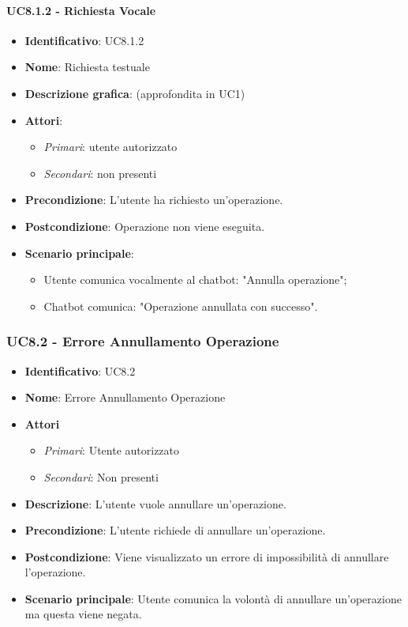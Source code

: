 \paragraph{UC8.1.2 - Richiesta Vocale}
\begin{itemize}
   \item \textbf{Identificativo}: UC8.1.2
   \item \textbf{Nome}: Richiesta testuale
   \item \textbf{Descrizione grafica}: (approfondita in UC1)
   \item \textbf{Attori}:
   \begin{itemize} 
       \item \textit{Primari}: utente autorizzato
       \item \textit{Secondari}: non presenti
   \end{itemize}
       \item \textbf{Precondizione}: L'utente ha richiesto un'operazione.
       \item \textbf{Postcondizione}: Operazione non viene eseguita. 
    \item \textbf{Scenario principale}: 
       \begin{itemize}
        \item Utente comunica vocalmente al chatbot: "Annulla operazione";
        \item Chatbot comunica: "Operazione annullata con successo".
       \end{itemize}
\end{itemize}

\subsubsection{UC8.2 - Errore Annullamento Operazione}
\begin{itemize}
	\item \textbf{Identificativo}: UC8.2
	\item \textbf{Nome}: Errore Annullamento Operazione 
	\item \textbf{Attori}
	\begin{itemize} 
		\item \textit{Primari}: Utente autorizzato
		\item \textit{Secondari}: Non presenti
	\end{itemize}
	\item \textbf{Descrizione}: L'utente vuole annullare un'operazione.
	\item \textbf{Precondizione}: L'utente richiede di annullare un'operazione.
	\item \textbf{Postcondizione}: Viene visualizzato un errore di impossibilità di annullare l'operazione.
	\item \textbf{Scenario principale}: Utente comunica la volontà di annullare un'operazione ma questa viene negata.
\end{itemize}
\newpage